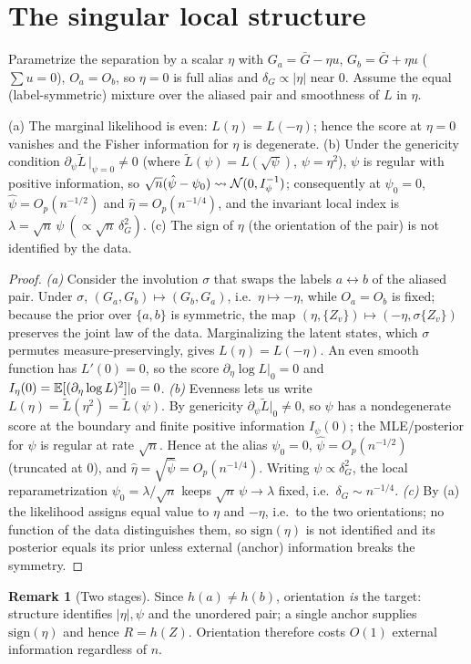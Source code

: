 \documentclass[11pt]{article}
\theoremstyle{plain}
\theoremstyle{definition}\newtheorem{assumption}{Assumption}\newtheorem{remark}{Remark}
\begin{document}
\section{The singular local structure}\label{sec:singular}
Parametrize the separation by a scalar $\eta$ with $G_a=\bar G-\eta u$, $G_b=\bar G+\eta u$ ($\sum u=0$),
$O_a=O_b$, so $\eta=0$ is full alias and $\delta_G\propto|\eta|$ near $0$. Assume the equal (label-symmetric)
mixture over the aliased pair and smoothness of $L$ in $\eta$.
\begin{proposition}\label{prop:singular}
(a) The marginal likelihood is even: $L(\eta)=L(-\eta)$; hence the score at $\eta=0$ vanishes and the Fisher
information for $\eta$ is degenerate. (b) Under the genericity condition $\partial_\psi \tilde L\,|_{\psi=0}\neq0$
(where $\tilde L(\psi)=L(\sqrt\psi)$, $\psi=\eta^2$), $\psi$ is regular with positive information, so
$\sqrt n(\hat\psi-\psi_0)\rightsquigarrow\mathcal{N}(0,I_\psi^{-1})$; consequently at $\psi_0=0$, $\hat\psi=O_p(n^{-1/2})$ and
$\hat\eta=O_p(n^{-1/4})$, and the invariant local index is $\lambda=\sqrt n\,\psi\ (\propto\sqrt n\,\delta_G^2)$.
(c) The sign of $\eta$ (the orientation of the pair) is not identified by the data.
\end{proposition}
\begin{proof}
\emph{(a)} Consider the involution $\sigma$ that swaps the labels $a\leftrightarrow b$ of the aliased pair. Under
$\sigma$, $(G_a,G_b)\mapsto(G_b,G_a)$, i.e.\ $\eta\mapsto-\eta$, while $O_a=O_b$ is fixed; because the prior over
$\{a,b\}$ is symmetric, the map $(\eta,\{Z_v\})\mapsto(-\eta,\sigma\{Z_v\})$ preserves the joint law of the data.
Marginalizing the latent states, which $\sigma$ permutes measure-preservingly, gives $L(\eta)=L(-\eta)$. An even
smooth function has $L'(0)=0$, so the score $\partial_\eta\log L|_0=0$ and $I_\eta(0)=\mathbb{E}[(\partial_\eta\log L)^2]|_0
=0$. \emph{(b)} Evenness lets us write $L(\eta)=\tilde L(\eta^2)=\tilde L(\psi)$. By genericity
$\partial_\psi\tilde L|_0\neq0$, so $\psi$ has a nondegenerate score at the boundary and finite positive
information $I_\psi(0)$; the MLE/posterior for $\psi$ is regular at rate $\sqrt n$. Hence at the alias
$\psi_0=0$, $\hat\psi=O_p(n^{-1/2})$ (truncated at $0$), and $\hat\eta=\sqrt{\hat\psi}=O_p(n^{-1/4})$. Writing
$\psi\propto\delta_G^2$, the local reparametrization $\psi_0=\lambda/\sqrt n$ keeps $\sqrt n\,\psi\to\lambda$ fixed,
i.e.\ $\delta_G\sim n^{-1/4}$. \emph{(c)} By (a) the likelihood assigns equal value to $\eta$ and $-\eta$, i.e.\ to
the two orientations; no function of the data distinguishes them, so $\mathrm{sign}(\eta)$ is not identified and
its posterior equals its prior unless external (anchor) information breaks the symmetry.
\end{proof}
\begin{remark}[Two stages]
Since $h(a)\neq h(b)$, orientation \emph{is} the target: structure identifies $|\eta|,\psi$ and the unordered pair;
a single anchor supplies $\mathrm{sign}(\eta)$ and hence $R=h(Z)$. Orientation therefore costs $O(1)$ external
information regardless of $n$.
\end{remark}
\end{document}

